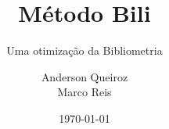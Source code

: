 \documentclass{beamer}
\author{Anderson Queiroz \\
Marco Reis}
\title{Método Bili}
\subtitle[]{Uma otimização da Bibliometria}
\date{\today}
\begin{document}
\begin{frame}
\titlepage
\begin{figure}
    
\end{figure}
\end{frame}






\end{document}
